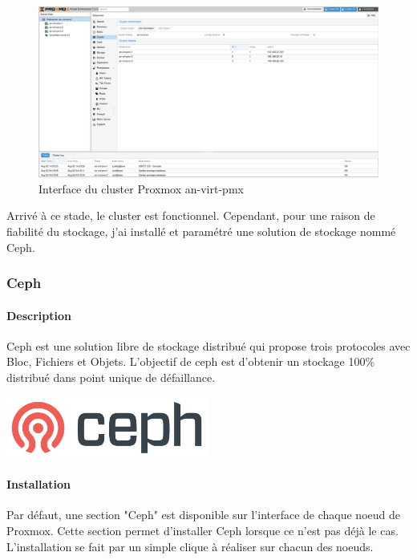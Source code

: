 \documentclass[12pt]{article}
\begin{document}
\begin{figure}
    \centering
        \includegraphics[width=\textwidth]{src/proxmox_interface.png}
    \caption{Interface du cluster Proxmox an-virt-pmx}
    \label{fig:proxmox_virt1}
\end{figure}

Arrivé à ce stade, le cluster est fonctionnel. 
Cependant, pour une raison de fiabilité du stockage, j'ai installé et paramétré une solution de stockage nommé Ceph.

\subsubsection{Ceph}
\paragraph{Description}
\noindent%
\begin{minipage}{.7\textwidth}%
Ceph est une solution libre de stockage distribué qui propose trois protocoles avec Bloc, Fichiers et Objets.
L'objectif de ceph est d'obtenir un stockage 100\% distribué dans point unique de défaillance.

\end{minipage}%
\hfill
\begin{minipage}{.3\textwidth}%
\begin{center}
\includegraphics[width=0.5\textwidth]{src/ceph.png}
\end{center}
\end{minipage}%

\paragraph{Installation}
Par défaut, une section "Ceph" est disponible sur l'interface de chaque noeud de Proxmox. 
Cette section permet d'installer Ceph lorsque ce n'est pas déjà le cas.
L'installation se fait par un simple clique à réaliser sur chacun des noeuds.
\end{document}
